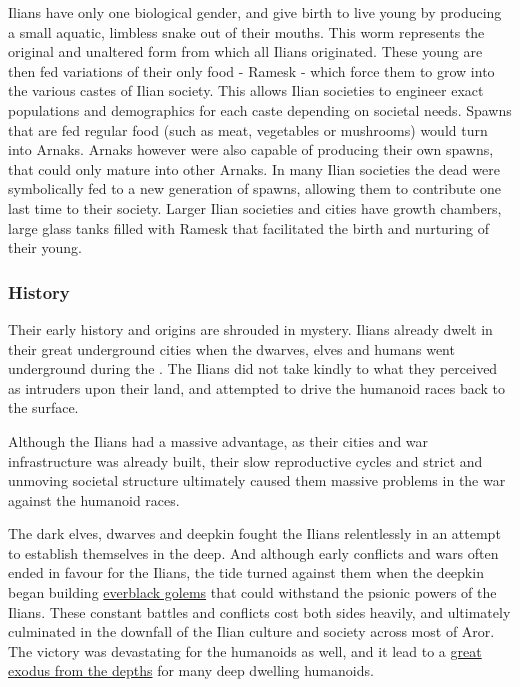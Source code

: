 Ilians have only one biological gender, and give birth to live young by
producing a small aquatic, limbless snake out of their mouths. This worm
represents the original and unaltered form from which all Ilians
originated. These young are then fed variations of their only food - Ramesk -
which force them to grow into the various castes of Ilian society. This allows
Ilian societies to engineer exact populations and demographics for each caste
depending on societal needs. Spawns that are fed regular food (such as meat,
vegetables or mushrooms) would turn into Arnaks. Arnaks however were also
capable of producing their own spawns, that could only mature into other
Arnaks. In many Ilian societies the dead were symbolically fed to a new
generation of spawns, allowing them to contribute one last time to their
society. Larger Ilian societies and cities have growth chambers, large glass
tanks filled with Ramesk that facilitated the birth and nurturing of their
young.

\subsubsection{History}

Their early history and origins are shrouded in mystery. Ilians already dwelt
in their great underground cities when the dwarves, elves and humans went
underground during the . The Ilians did not take kindly to
what they perceived as intruders upon their land, and attempted to drive the
humanoid races back to the surface.

Although the Ilians had a massive advantage, as their cities and war
infrastructure was already built, their slow reproductive cycles and strict
and unmoving societal structure ultimately caused them massive problems in
the war against the humanoid races.

The dark elves, dwarves and deepkin fought the Ilians relentlessly in an
attempt to establish themselves in the deep. And although early conflicts and
wars often ended in favour for the Ilians, the tide turned against them when
the deepkin began building \hyperref[sec:Everblack Golem]{everblack golems}
that could withstand the psionic powers of the Ilians. These constant battles
and conflicts cost both sides heavily, and ultimately culminated in the
downfall of the Ilian culture and society across most of Aror. The victory was
devastating for the humanoids as well, and it lead to a \hyperref[sec:Great
 Exodus]{great exodus from the depths} for many deep dwelling
humanoids.

